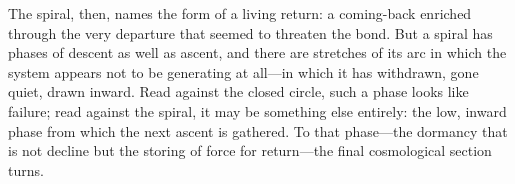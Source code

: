 \noindent
The spiral, then, names the form of a living return: a coming-back enriched through the very departure that seemed to threaten the bond. But a spiral has phases of descent as well as ascent, and there are stretches of its arc in which the system appears not to be generating at all---in which it has withdrawn, gone quiet, drawn inward. Read against the closed circle, such a phase looks like failure; read against the spiral, it may be something else entirely: the low, inward phase from which the next ascent is gathered. To that phase---the dormancy that is not decline but the storing of force for return---the final cosmological section turns.

